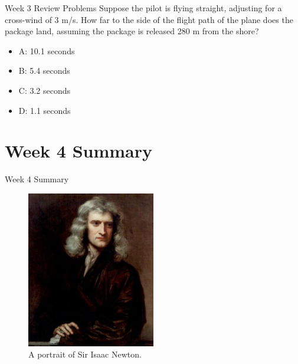 \documentclass{beamer}
\begin{document}
\begin{frame}{Week 3 Review Problems}
\small
Suppose the pilot is flying straight, adjusting for a cross-wind of 3 m/s.  How far to the side of the flight path of the plane does the package land, assuming the package is released 280 m from the shore?
\begin{itemize}
\item A: 10.1 seconds
\item B: 5.4 seconds
\item C: 3.2 seconds
\item D: 1.1 seconds
\end{itemize}
\end{frame}

\section{Week 4 Summary}

\begin{frame}{Week 4 Summary}
\begin{figure}
\centering
\includegraphics[width=0.5\textwidth]{figures/newton.png}
\caption{\label{fig:newton} A portrait of Sir Isaac Newton.}
\end{figure}
\end{frame}
\end{document}
